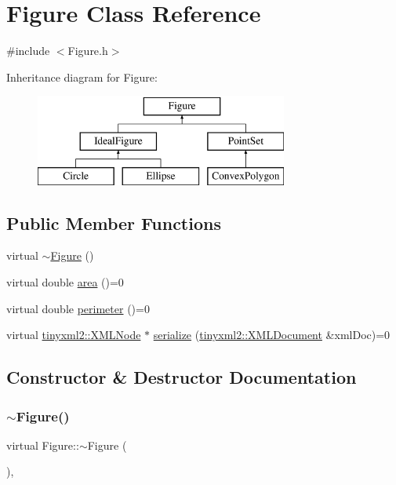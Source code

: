 \hypertarget{class_figure}{}\section{Figure Class Reference}
\label{class_figure}


{\ttfamily \#include $<$Figure.\+h$>$}

Inheritance diagram for Figure\+:\begin{figure}[H]
\begin{center}
\leavevmode
\includegraphics[height=3.000000cm]{class_figure}
\end{center}
\end{figure}
\subsection*{Public Member Functions}
\begin{DoxyCompactItemize}
\item 
virtual \hyperlink{class_figure_a654f8f4944edcfb248fb86b77b8b21d3}{$\sim$\+Figure} ()
\item 
virtual double \hyperlink{class_figure_a9860bda67fc9ce8127a812e167c4ce75}{area} ()=0
\item 
virtual double \hyperlink{class_figure_acae6802e2a55b322f7566f313d474546}{perimeter} ()=0
\item 
virtual \hyperlink{classtinyxml2_1_1_x_m_l_node}{tinyxml2\+::\+X\+M\+L\+Node} $\ast$ \hyperlink{class_figure_a11994f67ee209a46047e0897680f6313}{serialize} (\hyperlink{classtinyxml2_1_1_x_m_l_document}{tinyxml2\+::\+X\+M\+L\+Document} \&xml\+Doc)=0
\end{DoxyCompactItemize}


\subsection{Constructor \& Destructor Documentation}
\mbox{\label{class_figure_a654f8f4944edcfb248fb86b77b8b21d3}} 
\subsubsection{\texorpdfstring{$\sim$\+Figure()}{~Figure()}}
{\footnotesize\ttfamily virtual Figure\+::$\sim$\+Figure (\begin{DoxyParamCaption}{ }\end{DoxyParamCaption})\hspace{0.3cm}{\ttfamily [inline]}, {\ttfamily [virtual]}}



